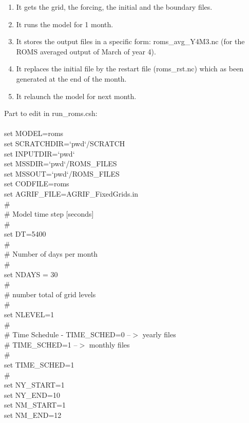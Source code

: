 \begin{enumerate}
\item It gets the grid, the forcing, the initial and the boundary files.
\item It runs the model for 1 month.
\item It stores the output files in a specific form: roms\_avg\_Y4M3.nc (for the ROMS 
averaged output of March of year 4).
\item It replaces the initial file by the restart file (roms\_rst.nc) which as 
been generated at the end of the month.
\item It relaunch the model for next month.
\end{enumerate}

Part to edit in run\_roms.csh:\\
\\
set MODEL=roms \\
set SCRATCHDIR=`pwd`/SCRATCH \\
set INPUTDIR=`pwd` \\
set MSSDIR=`pwd`/ROMS\_FILES \\
set MSSOUT=`pwd`/ROMS\_FILES \\
set CODFILE=roms \\
set AGRIF\_FILE=AGRIF\_FixedGrids.in \\
\# \\
\# Model time step [seconds] \\
\# \\
set DT=5400 \\
\# \\
\# Number of days per month \\
\# \\
set NDAYS = 30 \\
\# \\
\# number total of grid levels \\
\# \\
set NLEVEL=1 \\
\# \\
\#  Time Schedule  -  TIME\_SCHED=0 --$>$ yearly files \\
\#                    TIME\_SCHED=1 --$>$ monthly files \\
\# \\
set TIME\_SCHED=1 \\
\# \\
set NY\_START=1 \\
set NY\_END=10 \\
set NM\_START=1 \\
set NM\_END=12 \\
\\

